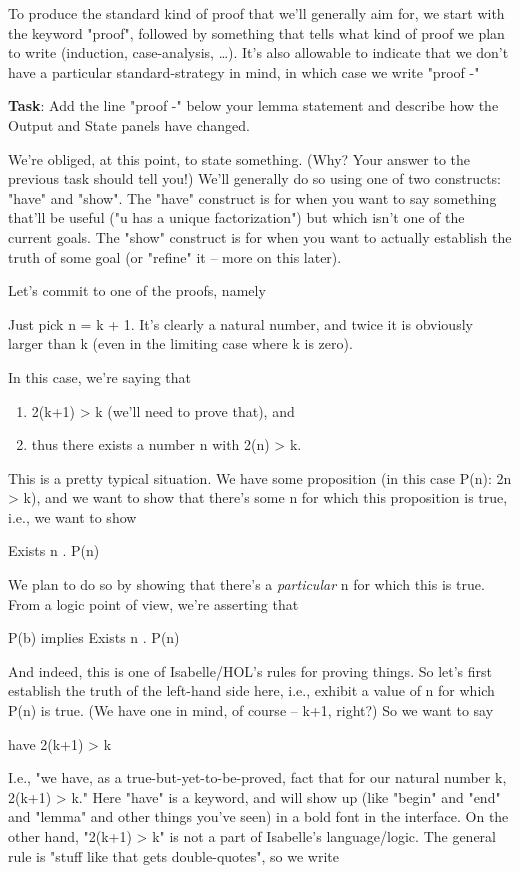 To produce the standard kind of proof that we'll generally aim for, we start with the keyword "proof", followed by something that tells what kind of proof we plan to write (induction, case-analysis, …). It's also allowable to indicate that we don't have a particular standard-strategy in mind, in which case we write "proof -"

\textbf{Task}: Add the line "proof -" below your lemma statement and describe how the Output and State panels have changed. 

We're obliged, at this point, to state something. (Why? Your answer to the previous task should tell you!) We'll generally do so using one of two constructs: "have" and "show". The "have" construct is for when you want to say something that'll be useful ("u has a unique factorization") but which isn't one of the current goals. The "show" construct is for when you want to actually establish the truth of some goal (or "refine" it -- more on this later). 

Let's commit to one of the proofs, namely

Just pick n = k + 1. It's clearly a natural number, and twice it is obviously larger than k (even in the limiting case where k is zero). 

In this case, we're saying that 

\begin{enumerate}
    \item 2(k+1) > k (we'll need to prove that), and 
    \item thus there exists a number n with 2(n) > k. 
\end{enumerate}
This is a pretty typical situation. We have some proposition (in this case P(n): 2n > k), and we want to show that there's some n for which this proposition is true, i.e., we want to show

Exists n . P(n)

We plan to do so by showing that there's a \textit{particular} n for which this is true. From a logic point of view, we're asserting that

P(b) implies Exists n . P(n)

And indeed, this is one of Isabelle/HOL's rules for proving things. So let's first establish the truth of the left-hand side here, i.e., exhibit a value of n for which P(n) is true. (We have one in mind, of course -- k+1, right?) So we want to say

have 2(k+1) > k

I.e., "we have, as a true-but-yet-to-be-proved, fact that for our natural number k, 2(k+1) > k." Here "have" is a keyword, and will show up (like "begin" and "end" and "lemma" and other things you've seen) in a bold font in the interface. On the other hand, "2(k+1) > k" is not a part of Isabelle's language/logic. The general rule is "stuff like that gets double-quotes", so we write

